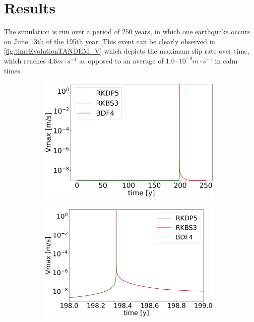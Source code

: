 \documentclass{report}
\begin{document}
\section{Results}
The simulation is run over a period of 250 years, in which one earthquake occurs on June 13th of the 195th year. This event can be clearly observed in \autoref{fig:timeEvolutionTANDEM_V} which depicts the maximum slip rate over time, which reaches $4.6m\cdot s^{-1}$ as opposed to an average of $1.0 \cdot 10^{-9}m\cdot s^{-1}$ in calm times. 
\begin{figure}[H]
    \centering
    \begin{subfigure}{0.32\textwidth}
    	\centering
    	\includegraphics[width=1\textwidth]{images/TANDEMtimeEvolutionVall.png}
    \end{subfigure} 
    \begin{subfigure}{0.32\textwidth}
    	\centering
    	\includegraphics[width=1\textwidth]{images/TANDEMtimeEvolutionVsurroundings.png}

\end{subfigure}
\end{figure}
\end{document}

